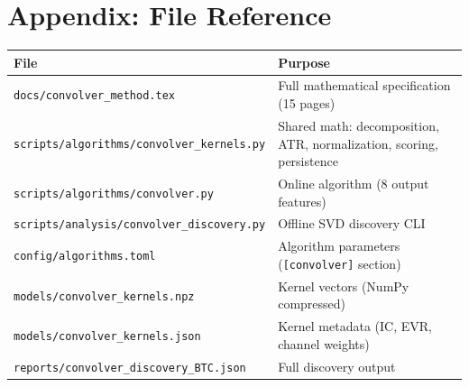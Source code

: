 \documentclass[11pt,a4paper]{article}
\begin{document}
\section*{Appendix: File Reference}

\begin{center}
\small
\begin{tabular}{lp{8cm}}
\hline
\textbf{File} & \textbf{Purpose} \\
\hline
\texttt{docs/convolver\_method.tex} & Full mathematical specification (15 pages) \\
\texttt{scripts/algorithms/convolver\_kernels.py} & Shared math: decomposition, ATR, normalization, scoring, persistence \\
\texttt{scripts/algorithms/convolver.py} & Online algorithm (8 output features) \\
\texttt{scripts/analysis/convolver\_discovery.py} & Offline SVD discovery CLI \\
\texttt{config/algorithms.toml} & Algorithm parameters (\texttt{[convolver]} section) \\
\texttt{models/convolver\_kernels.npz} & Kernel vectors (NumPy compressed) \\
\texttt{models/convolver\_kernels.json} & Kernel metadata (IC, EVR, channel weights) \\
\texttt{reports/convolver\_discovery\_BTC.json} & Full discovery output \\
\hline
\end{tabular}
\end{center}
\end{document}
